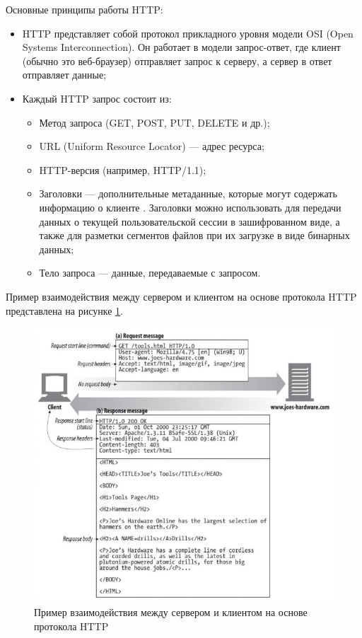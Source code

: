 	Основные принципы работы HTTP:
	\begin{itemize}[label=$\bullet$]
		\item HTTP представляет собой протокол прикладного уровня модели OSI (Open Systems Interconnection). Он работает в модели запрос-ответ, где клиент (обычно это веб-браузер) отправляет запрос к серверу, а сервер в ответ отправляет данные;
		\item Каждый HTTP запрос состоит из:
		\begin{itemize}[label=$\circ$]
			\item Метод запроса (GET, POST, PUT, DELETE и др.);
			\item URL (Uniform Resource Locator) — адрес ресурса;
			\item HTTP-версия (например, HTTP/1.1);
			\item Заголовки — дополнительные метаданные, которые могут содержать информацию о клиенте \cite{gourleyHttpGuide}. Заголовки можно использовать для передачи данных о текущей пользовательской сессии в зашифрованном виде, а также для разметки сегментов файлов при их загрузке в виде бинарных данных;
			\item Тело запроса — данные, передаваемые с запросом.
		\end{itemize}
	\end{itemize}

	Пример взаимодействия между сервером и клиентом на основе протокола HTTP представлена на рисунке \ref{fig:http_scheme}.
	\begin{figure}[ht!] 
		\center
		\includegraphics [scale=0.8] {my_folder/images//http_scheme}
		\caption{Пример взаимодействия между сервером и клиентом на основе протокола HTTP \cite{gourleyHttpGuide}}
		\label{fig:http_scheme}  
	\end{figure}
	

